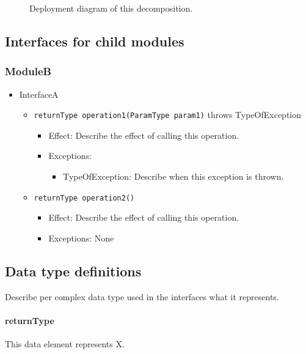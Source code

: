 \begin{figure}[!htp]
	\centering
	\caption{Deployment diagram of this decomposition.
	}\label{fig:it1-depl_main}
\end{figure}

\subsection{Interfaces for child modules}
\subsubsection*{ModuleB}
\begin{itemize}
	\item InterfaceA
	\begin{itemize}
		\item \texttt{returnType operation1(ParamType param1)} throws TypeOfException
		\begin{itemize}
			\item Effect: Describe the effect of calling this operation.
			\item Exceptions:
			\begin{itemize}
				\item TypeOfException: Describe when this exception is thrown.
			\end{itemize}
		\end{itemize}

		\item \texttt{returnType operation2()}
		\begin{itemize}
			\item Effect: Describe the effect of calling this operation.
			\item Exceptions: None
		\end{itemize}
	\end{itemize}
\end{itemize}

\subsection{Data type definitions}
Describe per complex data type used in the interfaces what it represents.

\paragraph{returnType} This data element represents X.

